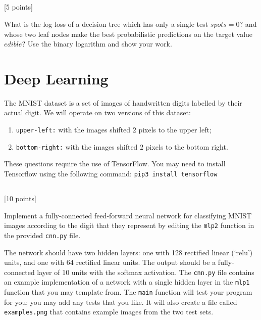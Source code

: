 \documentclass[12pt]{article}
\newcommand{\ben}{\begin{enumerate}}
\newcommand{\een}{\end{enumerate}}
\newcommand{\ie}{\item}
\newcommand{\tcv}[1]{\textcolor{m4}{#1}}
\newcounter{totalpoints}
\newcommand{\points}[1]{{\addtocounter{totalpoints}{#1}\tcv{[#1 points]}}}
\begin{document}
{\begin{answer}{1in}
\end{answer}

\clearpage\subsection{} \points{5}
What is the log loss of a decision tree which has only a single test $spots = 0?$ and whose two leaf nodes make the best probabilistic predictions on the target value $edible$? Use the binary logarithm and show your work.
 
\begin{answer}{1.5in}
\end{answer}


\section{Deep Learning}

The MNIST dataset is a set of images of handwritten digits labelled by their actual digit.
We will operate on two versions of this dataset: 
\ben
\ie {\tt upper-left:} with the images shifted $2$ pixels to the upper left;
\ie {\tt bottom-right:} with the images shifted $2$ pixels to the bottom right.
\een
These questions require the use of TensorFlow.  You may need to install Tensorflow using the following command: \texttt{pip3 install tensorflow}

\subsection{}
\points{10}
Implement a fully-connected feed-forward neural network for classifying MNIST images according to the digit that they represent by editing the \verb|mlp2| function in the provided \texttt{cnn.py} file.

The network should have two hidden layers: one with 128 rectified linear (`relu') units, and one with 64 rectified linear units.  The output should be a fully-connected layer of 10 units with the softmax activation.  The \texttt{cnn.py} file contains an example implementation of a network with a single hidden layer in the \verb|mlp1| function that you may template from.  The \verb|main| function will test your program for you; you may add any tests that you like.
It will also create a file called \texttt{examples.png} that contains example images from the two test sets.

}
\end{document}
